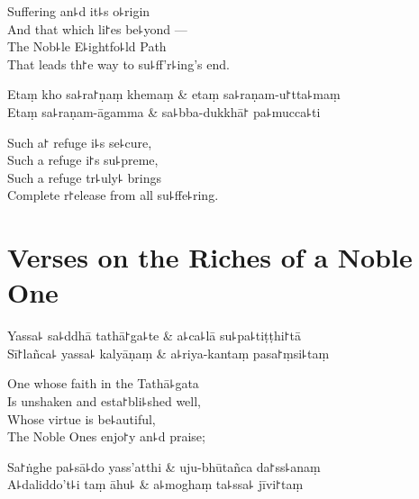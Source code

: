 \begin{english}
  Suffering an꜕d it꜕s o꜕rigin\\
  And that which li꜓es be꜕yond ---\\
  The Nob꜕le E꜕ightfo꜕ld Path\\
  That leads th꜓e way to su꜕ff'r꜕ing's end.
\end{english}

\begin{twochants}
  Etaṃ kho sa꜕ra꜓ṇaṃ khemaṃ & etaṃ sa꜕raṇam-u꜓tta꜕maṃ \\
  Etaṃ sa꜕raṇam-āgamma & sa꜕bba-dukkhā꜓ pa꜕mucca꜕ti \\
\end{twochants}

\begin{english}
  Such a꜓ refuge i꜕s se꜕cure,\\
  Such a refuge i꜓s su꜕preme,\\
  Such a refuge tr꜕uly꜕ brings\\
  Complete r꜓elease from all su꜕ffe꜕ring.
\end{english}

\chapter{Verses on the Riches of a Noble One}%



\begin{leader}
\end{leader}

\begin{twochants}
  Yassa꜕ sa꜕ddhā tathā꜓ga꜕te & a꜕ca꜕lā su꜕pa꜕tiṭṭhi꜓tā \\
  Sī꜓lañca꜕ yassa꜕ kalyāṇaṃ & a꜕riya-kantaṃ pasa꜓ṃsi꜕taṃ \\
\end{twochants}

\begin{english}
  One whose faith in the Tathā꜕gata\\
  Is unshaken and esta꜓bli꜕shed well,\\
  Whose virtue is be꜕autiful,\\
  The Noble Ones enjo꜓y an꜕d praise;
\end{english}

\begin{twochants}
  Sa꜓ṅghe pa꜕sā꜕do yass'atthi & uju-bhūtañca da꜓ss꜕anaṃ \\
  A꜕daliddo't꜕i taṃ āhu꜕ & a꜕moghaṃ ta꜕ssa꜕ jīvi꜓taṃ \\
\end{twochants}

